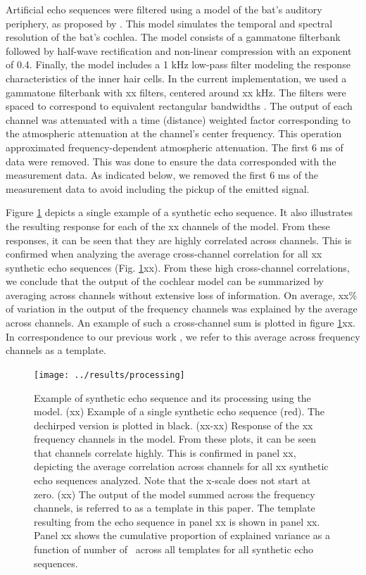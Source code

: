 \documentclass[preprint,5p]{elsarticle}
\begin{document}
Artificial echo sequences were filtered using a model of the bat's auditory periphery, as proposed by \citet{Wiegrebe2008}. This model simulates the temporal and spectral resolution of the bat's cochlea. The model consists of a gammatone filterbank followed by half-wave rectification and non-linear compression with an exponent of 0.4. Finally, the model includes a 1 kHz low-pass filter modeling the response characteristics of the inner hair cells. In the current implementation, we used a gammatone filterbank with xx filters, centered around xx kHz. The filters were spaced to correspond to equivalent rectangular bandwidths \citep{Glasberg1990}. The output of each channel was attenuated with a time (distance) weighted factor corresponding to the atmospheric attenuation at the channel's center frequency. This operation approximated frequency-dependent atmospheric attenuation. The first 6 ms of data were removed. This was done to ensure the data corresponded with the measurement data. As indicated below, we removed the first 6 ms of the measurement  data to avoid including the pickup of the emitted signal. 

Figure \ref{fig:processing} depicts a single example of a synthetic echo sequence. It also illustrates the resulting response for each of the xx channels of the \citet{Wiegrebe2008} model. From these responses, it can be seen that they are highly correlated across channels. This is confirmed when analyzing the average cross-channel correlation for all xx synthetic echo sequences (Fig. \ref{fig:processing}xx). From these high cross-channel correlations, we conclude that the output of the cochlear model can be summarized by averaging across channels without extensive loss of information. On average, xx\% of variation in the output of the frequency channels was explained by the average across channels. An example of such a cross-channel sum is plotted in figure \ref{fig:processing}xx. In correspondence to our previous work \citep{Vanderelst2016}, we refer to this average across frequency channels as a template.

\begin{figure}[tb]
	\centering
	\texttt{[image: ../results/processing]}
	\caption{Example of synthetic echo sequence and its processing using the \citet{Wiegrebe2008} model. (xx) Example of a single synthetic echo sequence (red). The dechirped version is plotted in black. (xx-xx) Response of the xx frequency channels in the \citet{Wiegrebe2008} model. From these plots, it can be seen that channels correlate highly. This is confirmed in panel xx, depicting the average correlation across channels for all xx synthetic echo sequences analyzed. Note that the x-scale does not start at zero. (xx) The output of the \citet{Wiegrebe2008} model summed across the frequency channels, is referred to as a template in this paper. The template resulting from the echo sequence in panel xx is shown in panel xx. Panel xx shows the cumulative proportion of explained variance as a function of number of \pc\ across all templates for all synthetic echo sequences.}
	\label{fig:processing}
\end{figure}
\end{document}
